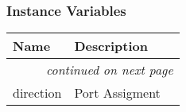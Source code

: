 
  \subsubsection{Instance Variables}

    \vspace{-1cm}
\hspace{\varindent}\begin{longtable}{|p{\varnamewidth}|p{\vardescrwidth}|l}
\cline{1-2}
\cline{1-2} \centering \textbf{Name} & \centering \textbf{Description}& \\
\cline{1-2}
\endhead\cline{1-2}\multicolumn{3}{r}{\small\textit{continued on next page}}\\\endfoot\cline{1-2}
\endlastfoot\raggedright d\-i\-r\-e\-c\-t\-i\-o\-n\- & Port Assigment&\\
\cline{1-2}
\end{longtable}

